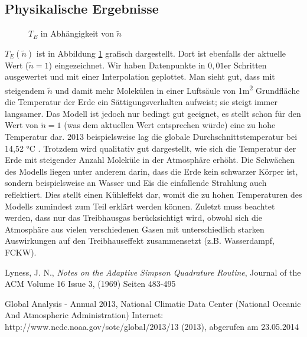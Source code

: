 \documentclass[10pt,a4paper]{article}
\begin{document}
\subsection{Physikalische Ergebnisse}
\label{ssec:physikalischeergebnisse}
\begin{figure}[htpb!]
\centering

\caption{$T_E$ in Abhängigkeit von $\tilde{n}$}
\label{fig:ergebnisse}
\end{figure}
\noindent$T_E(\tilde{n})$ ist in Abbildung \ref{fig:ergebnisse} grafisch dargestellt. Dort ist ebenfalls der aktuelle Wert ($\tilde{n}=1$) eingezeichnet. Wir haben Datenpunkte in $0,01$er Schritten ausgewertet und mit einer Interpolation geplottet. Man sieht gut, dass mit steigendem $\tilde{n}$ und damit mehr  Molekülen in einer Luftsäule von 1\si{\meter^2} Grundfläche die Temperatur der Erde ein Sättigungsverhalten aufweist; sie steigt immer langsamer. Das Modell ist jedoch nur bedingt gut geeignet, es stellt schon für den Wert von $\tilde{n}=1$ (was dem aktuellen Wert entsprechen würde) eine zu hohe Temperatur dar. 2013 beispielsweise lag die globale Durchschnittstemperatur bei 14,52 \si{\celsius} \cite{noaa}. Trotzdem wird qualitativ gut dargestellt, wie sich die Temperatur der Erde mit steigender Anzahl  Moleküle in der Atmosphäre erhöht.
Die Schwächen des Modells liegen unter anderem darin, dass die Erde kein schwarzer Körper ist, sondern beispielsweise an Wasser und Eis die einfallende Strahlung auch reflektiert. Dies stellt einen Kühleffekt dar, womit die zu hohen Temperaturen des Modells zumindest zum Teil erklärt werden können. Zuletzt muss beachtet werden, dass nur das Treibhausgas  berücksichtigt wird, obwohl sich die Atmosphäre aus vielen verschiedenen Gasen mit unterschiedlich starken Auswirkungen auf den Treibhauseffekt zusammensetzt (z.B. Wasserdampf, FCKW). 

\begin{thebibliography}{9}

 Lyness, J. N.,
 \emph{Notes on the Adaptive Simpson Quadrature Routine},
Journal of the ACM
Volume 16 Issue 3, (1969) 
Seiten 483-495 

Global Analysis - Annual 2013, National Climatic Data Center (National Oceanic And Atmospheric Administration) Internet: http://www.ncdc.noaa.gov/sotc/global/2013/13 (2013), abgerufen am 23.05.2014

\end{thebibliography}
\end{document}
